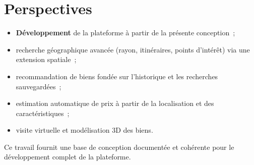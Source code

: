 \section{Perspectives}
\begin{itemize}[label=\textbullet,itemsep=1pt]
  \item \textbf{Développement} de la plateforme à partir de la présente
        conception~;
  \item recherche géographique avancée (rayon, itinéraires, points d'intérêt) via
        une extension spatiale~;
  \item recommandation de biens fondée sur l'historique et les recherches
        sauvegardées~;
  \item estimation automatique de prix à partir de la localisation et des
        caractéristiques~;
  \item visite virtuelle et modélisation 3D des biens.
\end{itemize}

\medskip
\noindent Ce travail fournit une base de conception documentée et cohérente pour
le développement complet de la plateforme.
